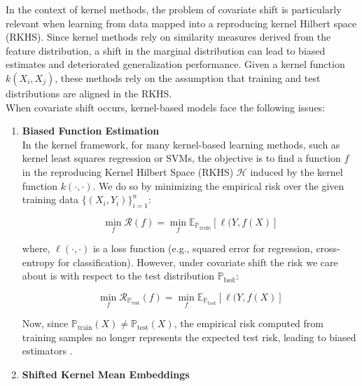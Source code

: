 In the context of kernel methods, the problem of covariate shift is particularly relevant when learning from data mapped into a reproducing kernel Hilbert space (RKHS). Since kernel methods rely on similarity measures derived from the feature distribution, a shift in the marginal distribution can lead to biased estimates and deteriorated generalization performance. Given a kernel function $k(X_i, X_j)$, these methods rely on the assumption that training and test distributions are aligned in the RKHS.\\

When covariate shift occurs, kernel-based models face the following issues:\\
\begin{enumerate}
    \item \textbf{Biased Function Estimation}\\
    
    In the kernel framework, for many kernel-based learning methods, such as kernel least squares regression or SVMs, the objective is to find a function $f$ in the reproducing Kernel Hilbert Space (RKHS) $\mathcal{H}$ induced by the kernel function $k(\cdot, \cdot)$. We do so by minimizing the empirical risk over the given training data $\{(X_i, Y_i)\}_{i=1}^{n}$:

    \begin{equation}
        \min_f \mathcal{R}(f) = \min_f \mathbb{E}_{\mathbb{P_{\text{train}}}}[\ell(Y, f(X)]
        \label{eqn:2.1}
    \end{equation}
    
    where, $\ell(\cdot, \cdot)$ is a loss function (e.g., squared error for regression, cross-entropy for classification). However, under covariate shift the risk we care about is with respect to the test distribution $\mathbb{P_{\text{test}}}$:

    \begin{equation}
        \min_f \mathcal{R}_{\mathbb{P}_\text{test}}(f) = \min_f \mathbb{E}_{\mathbb{P_{\text{test}}}}[\ell(Y, f(X)]
        \label{eqn:2.2}
    \end{equation}
    
    Now, since $\mathbb{P}_{\text{train}} (X) \neq \mathbb{P}_{\text{test}} (X)$, the empirical risk computed from training samples no longer represents the expected test risk, leading to biased estimators  \citep{shimodaira2000improving}.
    
    \item \textbf{Shifted Kernel Mean Embeddings}\\
    

\end{enumerate}
